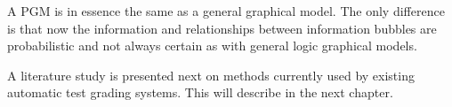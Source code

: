 A PGM is in essence the same as a general graphical model. The only difference is that now the information and relationships between information bubbles are probabilistic and not always certain as with general logic graphical models.

A literature study is presented next on methods currently used by existing automatic test grading systems. This will describe in the next chapter.